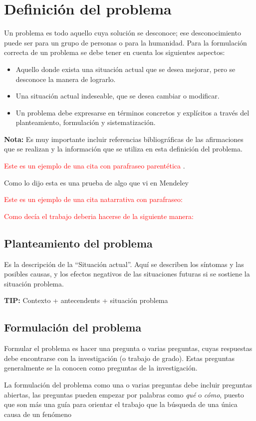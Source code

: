 \section{Definición del problema}
Un problema es todo aquello cuya solución se desconoce; ese desconocimiento puede ser para un grupo de personas o para la humanidad. Para la formulación correcta de un problema se debe tener en cuenta los siguientes aspectos:

\begin{itemize}
\item	Aquello donde exista una situación actual que se desea mejorar, pero se desconoce la manera de lograrlo.
\item	Una situación actual indeseable, que se desea cambiar o modificar.
\item	Un problema debe expresarse en términos concretos y explícitos a través del planteamiento, formulación y sistematización.
\end{itemize}

\textbf{Nota:} Es muy importante incluir referencias bibliográficas de las afirmaciones que se realizan y la información que se utiliza en esta definición del problema.


\textcolor{red}{Este es un ejemplo de una cita con parafraseo parentética \citep{Glorot2011}}.

Como lo dijo \citet{Razmi2008}  esta es una prueba de algo que vi en Mendeley \citep{Maroukian2021}
 
\textcolor{red}{Este es un ejemplo de una cita natarrativa con parafraseo:}
 
\textcolor{red}{Como decía \citet{Glorot2011} el trabajo deberia hacerse de la siguiente manera:} 

\subsection{Planteamiento del problema}
Es la descripción de la ``Situación actual''. Aquí se describen los síntomas y las posibles causas, y los efectos negativos de las situaciones futuras si se sostiene la situación problema. 

\textbf{TIP:} Contexto + antecendents  + situación problema

\subsection{Formulación del problema}
Formular el problema es hacer una pregunta o varias preguntas, cuyas respuestas debe encontrarse con la investigación (o trabajo de grado). Estas preguntas generalmente se la conocen como preguntas de la investigación.

La formulación del problema como una o varias preguntas debe incluir preguntas abiertas,  las preguntas pueden empezar por palabras como \textit{qué} o \textit{cómo}, puesto que son más una guía para orientar el trabajo que la búsqueda de una única causa de un fenómeno